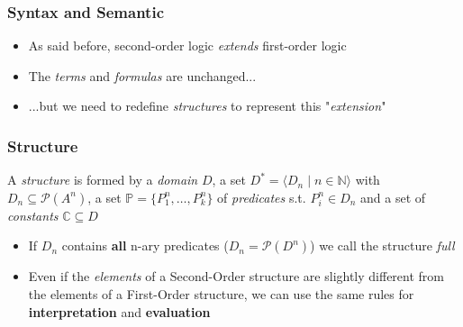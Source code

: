 \documentclass{beamer}
\begin{document}
            \begin{frame}
                \frametitle{Syntax and Semantic}
                \begin{itemize}
                    \item As said before, second-order logic \textit{extends} first-order logic
                    \item The \textit{terms} and \textit{formulas} are unchanged...
                    \item ...but we need to redefine \textit{structures} to represent this "\textit{extension}"
                \end{itemize}
            \end{frame}

            \begin{frame}
                \frametitle{Structure}
                \begin{definition}
                    A \textit{structure} is formed by a \textit{domain} $ D $, a set $ D^* = \langle D_n\; \vert\; n \in \mathbb{N} \rangle$ with $ D_n \subseteq \mathcal{P}(A^n) $, a set $ \mathbb{P} = \{ P_1^n, \dots, P_k^n \} $ of \textit{predicates} s.t. $ P_i^n \in D_n $ and a set of \textit{constants} $ \mathbb{C} \subseteq D $
                \end{definition}
                \begin{itemize}
                    \item If $ D_n $ contains \textbf{all} n-ary predicates ($ D_n = \mathcal{P}(D^n) $) we call the structure \textit{full}
                    \item Even if the \textit{elements} of a Second-Order structure are slightly different from the elements of a First-Order structure, we can use the same rules for \textbf{interpretation} and \textbf{evaluation}
                \end{itemize}
            \end{frame}
            
\end{document}
